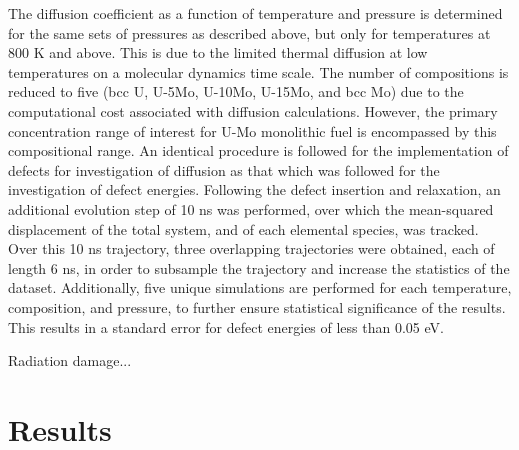 \documentclass[11pt, oneside]{elsarticle}
\begin{document}
The diffusion coefficient as a function of temperature and pressure is determined for the same sets of pressures as described above, but only for temperatures at 800 K and above. This is due to the limited thermal diffusion at low temperatures on a molecular dynamics time scale. The number of compositions is reduced to five (bcc U, U-5Mo, U-10Mo, U-15Mo, and bcc Mo) due to the computational cost associated with diffusion calculations. However, the primary concentration range of interest for U-Mo monolithic fuel is encompassed by this compositional range. An identical procedure is followed for the implementation of defects for investigation of diffusion as that which was followed for the investigation of defect energies. Following the defect insertion and relaxation, an additional evolution step of 10 ns was performed, over which the mean-squared displacement of the total system, and of each elemental species, was tracked. Over this 10 ns trajectory, three overlapping trajectories were obtained, each of length 6 ns, in order to subsample the trajectory and increase the statistics of the dataset. Additionally, five unique simulations are performed for each temperature, composition, and pressure, to further ensure statistical significance of the results. This results in a standard error for defect energies of less than 0.05 eV.

Radiation damage...




\section{Results}
\end{document}
